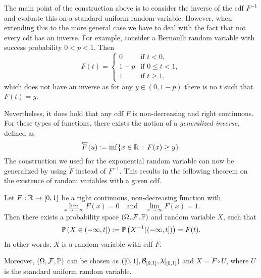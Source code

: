 The main point of the construction above is to consider the inverse of the cdf $F^{-1}$ and evaluate this on a standard uniform random variable. However, when extending this to the more general case we have to deal with the fact that not every cdf has an inverse. For example, consider a Bernoulli random variable with success probability $0 < p < 1$. Then
\[
	F(t) = \begin{cases}
		0 &\text{if } t < 0, \\
		1-p &\text{if } 0 \le t < 1, \\
		1 &\text{if } t \ge 1,
	\end{cases}
\] 
which does not have an inverse as for any $y \in (0,1-p)$ there is no $t$ such that $F(t) = y$.

Nevertheless, it does hold that any cdf $F$ is non-decreasing and right continuous. For these types of functions, there exists the notion of a \emph{generalized inverse}, defined as
\begin{equation}
	\overleftarrow{F}(u) := \inf\{ x \in \mathbb R \, : \, F(x) \ge y\}. 
\end{equation}
The construction we used for the exponential random variable can now be generalized by using $\overleftarrow{F}$ instead of $F^{-1}$. This results in the following theorem on the existence of random variables with a given cdf.

\begin{theorem}\label{thm:construction_random_variable}
Let $F : \mathbb R \to [0,1]$ be a right continuous, non-decreasing function with 
\[
	\lim_{x \to -\infty} F(x) = 0 \quad \text{and} \quad \lim_{x \to \infty} F(x) = 1.
\]
Then there exists a probability space  $(\Omega,\mathcal F, \mathbb P)$ and random variable $X$, such that 
\[
	\mathbb P\left(X \in (-\infty,t]\right) := \mathbb P\left(X^{-1}((-\infty,t])\right) = F(t).
\]
In other words, $X$ is a random variable with cdf $F$.

Moreover, $(\Omega,\mathcal F, \mathbb P)$ can be chosen as $([0,1], \mathcal B_{[0,1]}, \lambda|_{[0,1]})$ and $X = \overleftarrow{F}\circ U$, where $U$ is the standard uniform random variable.
\end{theorem}

